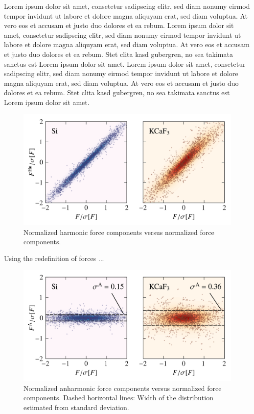 Lorem ipsum dolor sit amet, consetetur sadipscing elitr, sed diam nonumy eirmod tempor invidunt ut labore et dolore magna aliquyam erat, sed diam voluptua. At vero eos et accusam et justo duo dolores et ea rebum.
Lorem ipsum dolor sit amet, consetetur sadipscing elitr, sed diam nonumy eirmod tempor invidunt ut labore et dolore magna aliquyam erat, sed diam voluptua. At vero eos et accusam et justo duo dolores et ea rebum. Stet clita kasd gubergren, no sea takimata sanctus est Lorem ipsum dolor sit amet. Lorem ipsum dolor sit amet, consetetur sadipscing elitr, sed diam nonumy eirmod tempor invidunt ut labore et dolore magna aliquyam erat, sed diam voluptua. At vero eos et accusam et justo duo dolores et ea rebum. Stet clita kasd gubergren, no sea takimata sanctus est Lorem ipsum dolor sit amet.

\begin{figure}
	\includegraphics[width=\textwidth]{./data/plots/anharmonicity/5_density_plots/histogram_harmonic.png}
	\caption{
		Normalized harmonic force components versus normalized force components.
	}
\end{figure}

Using the redefinition of forces ...

\begin{figure}
	\includegraphics[width=\textwidth]{./data/plots/anharmonicity/5_density_plots/histogram.png}
	\caption{
		Normalized anharmonic force components versus normalized force components. Dashed horizontal lines: Width of the distribution estimated from standard deviation.
	}
\end{figure}


